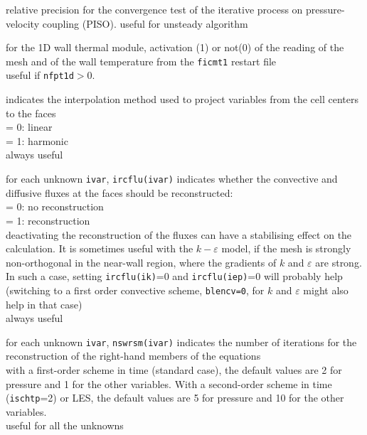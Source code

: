 {relative precision for the convergence test of the iterative process on
pressure-velocity coupling (PISO).
useful for unsteady algorithm
}

{for the  1D wall thermal module, activation (1) or not(0) of the reading
of the mesh and of the wall temperature from the {\tt ficmt1} restart file\\
useful if {\tt nfpt1d}$>$0.}

{indicates the interpolation method used to project variables from the cell
centers to the faces\\
\hspace*{1.3cm}= 0: linear\\
\hspace*{1.3cm}= 1: harmonic\\
always useful}

{for each unknown {\tt ivar}, {\tt ircflu(ivar)} indicates whether the convective
and diffusive fluxes at the faces should be reconstructed: \\
\hspace*{1.3cm}= 0: no reconstruction\\
\hspace*{1.3cm}= 1: reconstruction\\
deactivating the reconstruction of the fluxes can have a stabilising effect on
the calculation. It is sometimes useful with the $k-\varepsilon$ model, if the
mesh is strongly non-orthogonal in the near-wall region, where the gradients of
$k$ and $\varepsilon$ are strong. In such a case, setting {\tt ircflu(ik)}=0
and {\tt ircflu(iep)}=0 will probably help (switching to a first order
convective scheme, {\tt blencv=0}, for $k$ and $\varepsilon$ might also help in
that case)\\
always useful}

{for each unknown {\tt ivar}, {\tt nswrsm(ivar)} indicates the number of iterations for the
reconstruction of the right-hand members of the equations\\
with a first-order scheme in time
(standard case), the default values are 2 for pressure and 1 for the
other variables. With a second-order scheme in time ({\tt ischtp}=2) or LES, the
default values are 5 for pressure and 10 for the other variables.\\
useful for all the unknowns}

